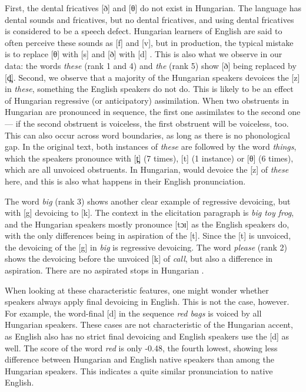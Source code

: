 \documentclass[output=paper]{LSP/langsci}
\begin{document}
First, the dental fricatives [ð] and [θ] do not exist in Hungarian. The language has dental sounds and fricatives, but no dental fricatives, and using dental fricatives is considered to be a speech defect. Hungarian learners of English are said to often perceive these sounds as [f] and [v], but in production, the typical mistake is to replace [θ] with [s] and [ð] with [d] \citep[p. 71]{nadasdy_background_2006}. This is also what we observe in our data: the words \textit{these} (rank 1 and 4) and \textit{the} (rank 5) show [ð] being replaced by [d̪]. Second, we observe that a majority of the Hungarian speakers devoices the [z] in \textit{these}, something the English speakers do not do. This is likely to be an effect of Hungarian regressive (or anticipatory) assimilation. When two obstruents in Hungarian are pronounced in sequence, the first one assimilates to the second one --- if the second obstruent is voiceless, the first obstruent will be voiceless, too. This can also occur across word boundaries, as long as there is no phonological gap. In the original text, both instances of \textit{these} are followed by the word \textit{things}, which the speakers pronounce with [t̪] (7 times), [t] (1 instance) or [θ] (6 times), which are all unvoiced obstruents. In Hungarian,  would devoice the [z] of \textit{these} here, and this is also what happens in their English pronunciation.

The word \textit{big} (rank 3) shows another clear example of regressive devoicing, but with [g] devoicing to [k]. The context in the elicitation paragraph is \textit{big toy frog}, and the Hungarian speakers mostly pronounce [tɔɪ] as the English speakers do, with the only differences being in aspiration of the [t]. Since the [t] is unvoiced, the devoicing of the [g] in \textit{big} is regressive devoicing. The word \textit{please} (rank 2) shows the devoicing before the unvoiced [k] of \textit{call}, but also a difference in aspiration. There are no aspirated stops in Hungarian \citep{petrova_voice_2006}.

When looking at these characteristic features, one might wonder whether speakers always apply final devoicing in English. This is not the case, however. For example, the word-final [d] in the sequence \textit{red bags} is voiced by all Hungarian speakers. These cases are not characteristic of the Hungarian accent, as English also has no strict final devoicing and English speakers use the [d] as well. The score of the word \textit{red} is only -0.48, the fourth lowest, showing less difference between Hungarian and English native speakers than among the Hungarian speakers. This indicates a quite similar pronunciation to native English.
\end{document}
